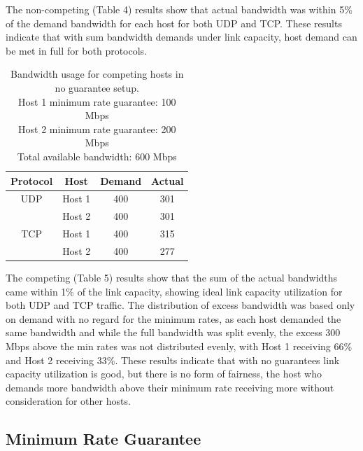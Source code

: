\documentclass[accepted,single]{gipaper}
\begin{document}
The non-competing (Table 4) results show that actual bandwidth was within 5\% of the demand bandwidth for each host for both UDP and TCP. These results indicate that with sum bandwidth demands under link capacity, host demand can be met in full for both protocols.

\begin{table}[h]
	\label{ng_c}
	\vspace{-2mm}
	\begin{center}
		\begin{small}
			\begin{tabular}{cccc}
				Protocol & Host & Demand & Actual \\
				\hline
				UDP & Host 1 & 400 & 301\\
				    & Host 2 & 400 & 301\\
				\hline
				TCP & Host 1 & 400 & 315\\
				    & Host 2 & 400 & 277\\
			\end{tabular}
		\end{small}
	\end{center}
	\caption{Bandwidth usage for competing hosts in no guarantee setup.\\
	Host 1 minimum rate guarantee: 100 Mbps\\
	Host 2 minimum rate guarantee: 200 Mbps\\	
	Total available bandwidth: 600 Mbps}
	\vspace{-3mm}
\end{table}

The competing (Table 5) results show that the sum of the actual bandwidths came within 1\% of the link capacity, showing ideal link capacity utilization for both UDP and TCP traffic. The distribution of excess bandwidth was based only on demand with no regard for the minimum rates, as each host demanded the same bandwidth and while the full bandwidth was split evenly, the excess 300 Mbps above the min rates was not distributed evenly, with Host 1 receiving 66\% and Host 2 receiving 33\%. These results indicate that with no guarantees link capacity utilization is good, but there is no form of fairness, the host who demands more bandwidth above their minimum rate receiving more without consideration for other hosts.   

\subsection{Minimum Rate Guarantee}
\label{min_guar}
\end{document}

